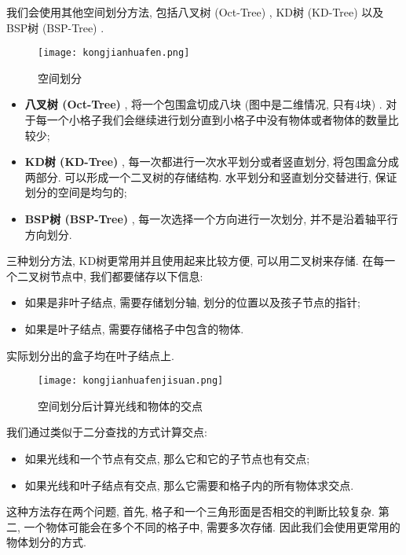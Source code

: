 \documentclass[openany]{progbookcn}
\begin{document}
我们会使用其他空间划分方法, 包括八叉树 (Oct-Tree) , KD树 (KD-Tree) 以及BSP树 (BSP-Tree) . 
\begin{figure}[H]
	\centering
	\texttt{[image: kongjianhuafen.png]}
	\caption{空间划分}
	\label{fig:kjhf}
\end{figure}
\begin{itemize}
	\item \textbf{八叉树 (Oct-Tree) }, 将一个包围盒切成八块 (图中是二维情况, 只有4块) . 对于每一个小格子我们会继续进行划分直到小格子中没有物体或者物体的数量比较少; 
	\item \textbf{KD树 (KD-Tree) }, 每一次都进行一次水平划分或者竖直划分, 将包围盒分成两部分. 可以形成一个二叉树的存储结构. 水平划分和竖直划分交替进行, 保证划分的空间是均匀的; 
	\item \textbf{BSP树 (BSP-Tree) }, 每一次选择一个方向进行一次划分, 并不是沿着轴平行方向划分. 
\end{itemize}
三种划分方法, KD树更常用并且使用起来比较方便, 可以用二叉树来存储. 在每一个二叉树节点中, 我们都要储存以下信息: 
\begin{itemize}
	\item 如果是非叶子结点, 需要存储划分轴, 划分的位置以及孩子节点的指针; 
	\item 如果是叶子结点, 需要存储格子中包含的物体. 
\end{itemize}

实际划分出的盒子均在叶子结点上. 

\begin{figure}[H]
	\centering
	\texttt{[image: kongjianhuafenjisuan.png]}
	\caption{空间划分后计算光线和物体的交点}
	\label{fig:kjhfjs}
\end{figure}
我们通过类似于二分查找的方式计算交点: 
\begin{itemize}
	\item 如果光线和一个节点有交点, 那么它和它的子节点也有交点; 
	\item 如果光线和叶子结点有交点, 那么它需要和格子内的所有物体求交点. 
\end{itemize}
这种方法存在两个问题, 首先, 格子和一个三角形面是否相交的判断比较复杂. 第二, 一个物体可能会在多个不同的格子中, 需要多次存储. 因此我们会使用更常用的物体划分的方式. 
\end{document}
